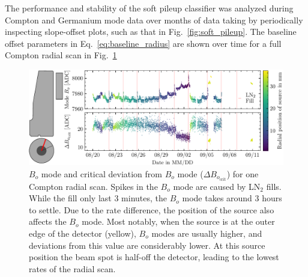The performance and stability of the soft pileup classifier was analyzed during Compton and Germanium mode data over months of data taking by periodically inspecting slope-offset plots, such as that in Fig.~\ref{fig:soft_pileup}. The baseline offset parameters in Eq.~\ref{eq:baseline_radius} are shown over time for a full Compton radial scan in Fig.~\ref{fig:baseline_stability} 
\begin{figure}[htb]
    \centering
    \includegraphics[width=6in]{figs/param/baseline_stability.pdf}
    \caption{$B_o$ mode and critical deviation from $B_o$ mode ($\Delta B_{o_\text{crit}}$) for one Compton radial scan. Spikes in the $B_o$ mode are caused by LN$_2$ fills. While the fill only last 3 minutes, the $B_o$ mode takes around 3 hours to settle. Due to the rate difference, the position of the source also affects the $B_o$ mode. Most notably, when the source is at the outer edge of the detector (yellow), $B_o$ modes are usually higher, and deviations from this value are considerably lower. At this source position the beam spot is half-off the detector, leading to the lowest rates of the radial scan.}
    \label{fig:baseline_stability}
\end{figure}

